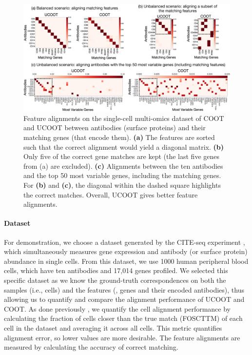 \begin{figure}
    \centering
    \includegraphics[trim={0.2cm 0.2cm 0.8cm 0.5cm}, clip, width=\linewidth, keepaspectratio=true]{./Chapitre3/fig/genes-alignments.pdf}
    \caption{Feature alignments on the single-cell multi-omics dataset of COOT and UCOOT between antibodies (surface proteins) and their matching genes (that encode them). \textbf{(a)} The features are sorted such that the correct alignment would yield a diagonal matrix. \textbf{(b)} Only five of the correct gene matches are kept (the last five genes from (a) are excluded). \textbf{(c)} Alignments between the ten antibodies and the top 50 most variable genes, including the matching genes.
    For \textbf{(b)} and \textbf{(c)}, the diagonal within the dashed square highlights the correct matches.
    Overall, UCOOT gives better feature alignments.
    \label{fig:multiomics}}
\end{figure}

\paragraph{Dataset} For demonstration, we choose a dataset generated by
the CITE-seq experiment \citep{CITEseq},
which simultaneously measures gene expression and antibody (or surface protein)
abundance in single cells. From this dataset, we use 1000 human peripheral blood cells,
which have ten antibodies and 17,014 genes profiled. We selected this specific dataset
as we know the ground-truth correspondences on both the samples (i.e., cells)
and the features (\ie, genes and their encoded antibodies), thus allowing us to quantify
and compare the alignment performance of UCOOT and COOT.
As done previously \citep{Pamona, Demetci22, Liu2019}, we quantify the cell alignment performance
by calculating the fraction of cells closer than the true match (FOSCTTM) of each cell
in the dataset and averaging it across all cells. This metric quantifies alignment error,
so lower values are more desirable. The feature alignments are measured by calculating
the accuracy of correct matching.


